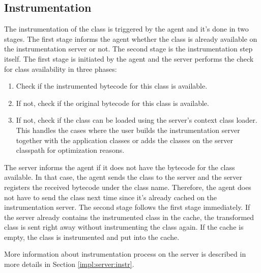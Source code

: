 \subsection{Instrumentation}
The instrumentation of the class is triggered by the agent and it's done in two stages. The first stage informs the agent whether the class is already available on the instrumentation server or not. The second stage is the instrumentation step itself. The first stage is initiated by the agent and the server performs the check for class availability in three phases:
\begin{enumerate}
	\item Check if the instrumented bytecode for this class is available.
	\item If not, check if the original bytecode for this class is available.
	\item If not, check if the class can be loaded using the server's context class loader. This handles the cases where the user builds the instrumentation server together with the application classes or adds the classes on the server classpath for optimization reasons.
\end{enumerate}

The server informs the agent if it does not have the bytecode for the class available. In that case, the agent sends the class to the server and the server registers the received bytecode under the class name. Therefore, the agent does not have to send the class next time since it's already cached on the instrumentation server.
The second stage follows the first stage immediately. If the server already contains the instrumented class in the cache, the transformed class is sent right away without instrumenting the class again. If the cache is empty, the class is instrumented and put into the cache.

More information about instrumentation process on the server is described in more details in Section \ref{impl:server:instr}.
